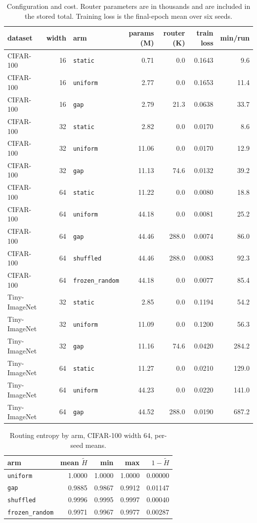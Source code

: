 \documentclass[10pt,a4paper]{article}
\begin{document}
\begin{table}[h]\centering\small
\caption{Configuration and cost. Router parameters are in thousands and
are included in the stored total. Training loss is the final-epoch mean
over six seeds.}
\label{tab:config}
\begin{tabular}{l r l rr r r}
\toprule
dataset & width & arm & params (M) & router (K) & train loss & min/run \\
\midrule
CIFAR-100 & 16 & \texttt{static} & 0.71 & 0.0 & 0.1643 & 9.6 \\
CIFAR-100 & 16 & \texttt{uniform} & 2.77 & 0.0 & 0.1653 & 11.4 \\
CIFAR-100 & 16 & \texttt{gap} & 2.79 & 21.3 & 0.0638 & 33.7 \\
CIFAR-100 & 32 & \texttt{static} & 2.82 & 0.0 & 0.0170 & 8.6 \\
CIFAR-100 & 32 & \texttt{uniform} & 11.06 & 0.0 & 0.0170 & 12.9 \\
CIFAR-100 & 32 & \texttt{gap} & 11.13 & 74.6 & 0.0132 & 39.2 \\
CIFAR-100 & 64 & \texttt{static} & 11.22 & 0.0 & 0.0080 & 18.8 \\
CIFAR-100 & 64 & \texttt{uniform} & 44.18 & 0.0 & 0.0081 & 25.2 \\
CIFAR-100 & 64 & \texttt{gap} & 44.46 & 288.0 & 0.0074 & 86.0 \\
CIFAR-100 & 64 & \texttt{shuffled} & 44.46 & 288.0 & 0.0083 & 92.3 \\
CIFAR-100 & 64 & \texttt{frozen\_random} & 44.18 & 0.0 & 0.0077 & 85.4 \\
Tiny-ImageNet & 32 & \texttt{static} & 2.85 & 0.0 & 0.1194 & 54.2 \\
Tiny-ImageNet & 32 & \texttt{uniform} & 11.09 & 0.0 & 0.1200 & 56.3 \\
Tiny-ImageNet & 32 & \texttt{gap} & 11.16 & 74.6 & 0.0420 & 284.2 \\
Tiny-ImageNet & 64 & \texttt{static} & 11.27 & 0.0 & 0.0210 & 129.0 \\
Tiny-ImageNet & 64 & \texttt{uniform} & 44.23 & 0.0 & 0.0220 & 141.0 \\
Tiny-ImageNet & 64 & \texttt{gap} & 44.52 & 288.0 & 0.0190 & 687.2 \\
\bottomrule
\end{tabular}
\end{table}

\begin{table}[h]\centering\small
\caption{Routing entropy by arm, CIFAR-100 width 64, per-seed means.}
\label{tab:entw64}
\begin{tabular}{l rrr r}
\toprule
arm & mean $\tilde H$ & min & max & $1-\tilde H$ \\
\midrule
\texttt{uniform} & 1.0000 & 1.0000 & 1.0000 & 0.00000 \\
\texttt{gap} & 0.9885 & 0.9867 & 0.9912 & 0.01147 \\
\texttt{shuffled} & 0.9996 & 0.9995 & 0.9997 & 0.00040 \\
\texttt{frozen\_random} & 0.9971 & 0.9967 & 0.9977 & 0.00287 \\
\bottomrule
\end{tabular}
\end{table}
\end{document}
